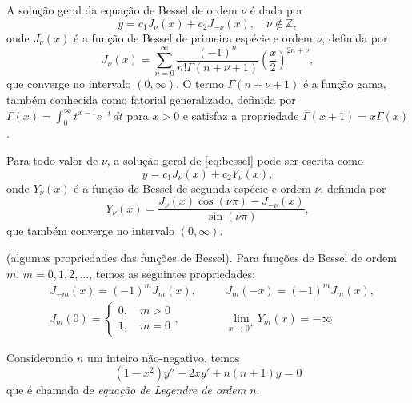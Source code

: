 \documentclass{article}
\begin{document}
\begin{prop}
    A solução geral da equação de Bessel de ordem \(\nu\) é dada por
    \begin{equation}
        y = c_1 J_{\nu}(x) + c_2 J_{-\nu}(x), \quad \nu \notin \mathbb{Z},
    \end{equation}
    \noindent onde \(J_{\nu}(x)\) é a função de Bessel de primeira espécie e ordem \(\nu\), definida por
    \begin{equation}
        J_{\nu}(x) = \sum_{n=0}^{\infty} \frac{(-1)^n}{n! \Gamma(n+\nu+1)} \left(\frac{x}{2}\right)^{2n+\nu},
    \end{equation}
    \noindent que converge no intervalo \((0,\infty)\). O termo \(\Gamma(n+\nu+1)\) é a função gama, também conhecida como fatorial generalizado, definida por \(\Gamma(x) = \int_0^{\infty} t^{x-1} e^{-t} \, dt\) para \(x>0\) e satisfaz a propriedade \(\Gamma(x+1) = x\Gamma(x)\).
\end{prop}

\begin{prop}
    Para todo valor de \(\nu\), a solução geral de \eqref{eq:bessel} pode ser escrita como
    \begin{equation}
        y = c_1 J_{\nu}(x) + c_2 Y_{\nu}(x),
    \end{equation}
    \noindent onde \(Y_{\nu}(x)\) é a função de Bessel de segunda espécie e ordem \(\nu\), definida por
    \begin{equation}
        Y_{\nu}(x) = \frac{J_{\nu}(x) \cos(\nu \pi) - J_{-\nu}(x)}{\sin(\nu \pi)},
    \end{equation}
    \noindent que também converge no intervalo \((0,\infty)\).
\end{prop}

\begin{prop} (algumas propriedades das funções de Bessel).
    Para funções de Bessel de ordem \(m\), \(m=0,1,2,\ldots\), temos as seguintes propriedades:
    \begin{align*}
        &J_{-m}(x) = (-1)^m J_m(x), \quad & &J_m(-x) = (-1)^m J_m(x), \\
        &J_m(0) = \begin{cases}
            0, \quad m > 0 \\
            1, \quad m = 0
        \end{cases}, \quad & &\lim_{x\to 0^{+}} Y_m(x) = -\infty
    \end{align*}
\end{prop}

\begin{defn}
    Considerando \(n\) um inteiro não-negativo, temos 
    \begin{equation}\label{eq:legendre}
        (1-x^2)y'' - 2xy' + n(n+1)y = 0
    \end{equation}
    \noindent que é chamada de \emph{equação de Legendre de ordem \(n\)}.
\end{defn}
\end{document}

